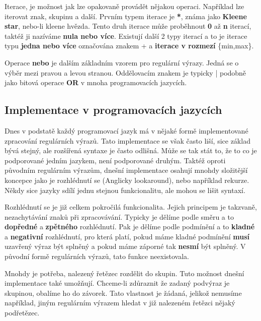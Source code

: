 Iterace, je možnost jak lze opakovaně provádět nějakou operaci.
Například lze iterovat znak, skupinu a další.
Prvním typem iterace je \textbf{*}, známa jako \textbf{Kleene star}, nebo-li kleene hvězda.
Tento druh iterace může proběhnout \textbf{0} až \textbf{n} iterací, taktéž ji nazíváme \textbf{nula nebo více}. 
Existují další 2 typy iterací a to je iterace typu \textbf{jedna nebo více} označována znakem + a \textbf{iterace v rozmezí} \{min,max\}.

Operace \textbf{nebo} je dalším základním vzorem pro regulární výrazy. 
Jedná se o výběr mezi pravou a levou stranou. Oddělovacím znakem je typicky | podobně jako bitová operace \textbf{OR} v mnoha programovacích jazycích.

\subsection*{Implementace v programovacích jazycích}

Dnes v podstatě každý programovací jazyk má v nějaké formě implementované zpracování regulárních výrazů.
Tato implementace se však často liší, sice základ bývá stejný, ale rozšířená syntaxe je často odlišná.
Může se tak stát to, že to co je podporované jedním jazykem, není podporované druhým.
Taktéž oproti původním regulárním výrazům, dnešní implementace osahují mnohdy složitější
koncepce jako je rozhlédnutí se (Anglicky lookaround), nebo například rekurze.
Někdy sice jazyky sdílí jednu stejnou funkcionalitu, ale mohou se lišit syntaxí.

Rozhlédnutí se je již celkem pokročilá funkcionalita. 
Jejich principem je takzvaně, nezachytávání znaků při zpracovávání.
Typicky je dělíme podle směru a to \textbf{dopředné} a \textbf{zpětného} rozhlédnutí.
Pak je dělíme podle podmínění a to \textbf{kladné} a \textbf{negativní} rozhlédnutí, pro která platí,
pokud máme kladné podmínění \textbf{musí} uzavřený výraz být splněný a pokud máme záporné tak \textbf{nesmí} být splněný.
V původní formě regulárních výrazů, tato funkce neexistovala.

Mnohdy je potřeba, nalezený řetězec rozdělit do skupin. 
Tuto možnost dnešní implementace také umožňují.
Chceme-li zdůraznit že zadaný podvýraz je skupinou, obalíme ho do závorek.
Tato vlastnost je žádaná, jelikož nemusíme například, jiným regulárním výrazem hledat
v již nalezeném řetězci nějaký podřetězec.